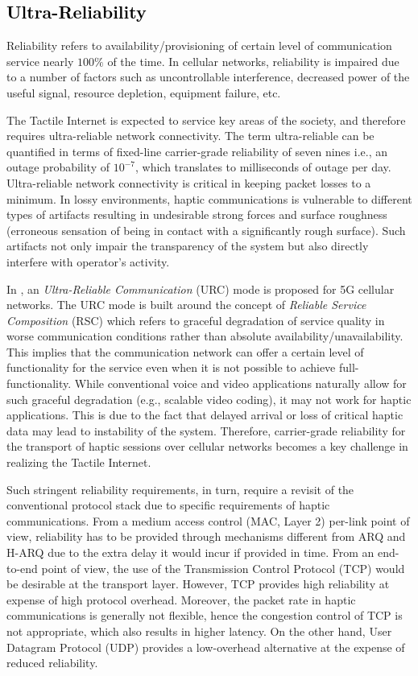 \documentclass[journal]{IEEEtran}
\begin{document}
\subsection{\textcolor{black}{Ultra-Reliability}}
Reliability refers to availability/provisioning of certain level of communication service nearly $100\%$ of the time. In cellular networks, reliability is impaired due to a number of factors \cite{URC} such as uncontrollable interference, decreased power of the useful signal, resource depletion, equipment failure, etc.

The Tactile Internet is expected to service key areas of the society, and therefore requires ultra-reliable network connectivity. The term ultra-reliable can be quantified in terms of fixed-line carrier-grade reliability of seven nines i.e., an outage probability of $10^{-7}$, which translates to milliseconds of outage per day. Ultra-reliable network connectivity is critical in keeping packet losses to a minimum. In lossy environments, haptic communications is vulnerable to different types of artifacts resulting in undesirable strong forces and surface roughness (erroneous sensation of being in contact with a significantly rough surface). Such artifacts not only impair the transparency of the system but also directly interfere with operator's activity.

In \cite{URC}, an \emph{Ultra-Reliable Communication} (URC) mode is proposed for 5G cellular networks. The URC mode is built around the concept of \emph{Reliable Service Composition} (RSC) which refers to graceful degradation of service quality in worse communication conditions rather than absolute availability/unavailability. This implies that the communication network can offer a certain level of functionality for the service even when it is not possible to achieve full-functionality. While conventional voice and video applications naturally allow for such graceful degradation (e.g., scalable video coding), it may not work for haptic applications. This is due to the fact that delayed arrival or loss of critical haptic data may lead to instability of the system. Therefore, carrier-grade reliability for the transport of haptic sessions over cellular networks becomes a key challenge in realizing the Tactile Internet.

Such stringent reliability requirements, in turn, require a revisit of the conventional protocol stack due to specific requirements of haptic communications. From a medium access control (MAC, Layer 2) per-link point of view, reliability has to be provided through mechanisms different from ARQ and H-ARQ due to the extra delay it would incur if provided in time. From an end-to-end point of view, the use of the Transmission Control Protocol (TCP) would be desirable at the transport layer.  However, TCP provides high reliability at expense of high protocol overhead. Moreover, the packet rate in haptic communications is generally not flexible, hence the congestion control of TCP is not appropriate, which also results in higher latency. On the other hand, User Datagram Protocol (UDP) provides a low-overhead alternative at the expense of reduced reliability.
\end{document}
